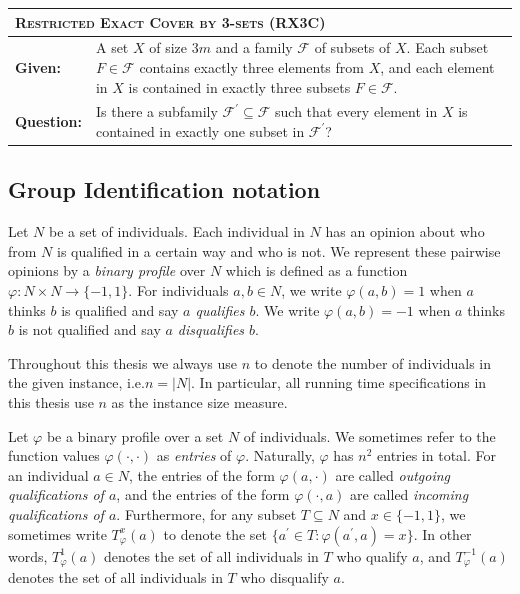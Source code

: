 \documentclass[
    12pt,               %
    a4paper,            %
    bibtotoc,           %
    pointlessnumbers,   %
    ngerman,            %
    titlepage,          %
    leqno,              %
    ]{scrarticle}       %
\begin{document}
\begin{tabularx}{\textwidth}{lX}
\hline
\multicolumn{2}{l}{
\textsc{Restricted Exact Cover by 3-sets} (RX3C)
} \\
\hline
\textbf{Given:} &
A set $X$ of size $3m$ and a family $\mathcal{F}$ of subsets of $X$. \newline
Each subset $F \in \mathcal{F}$ contains exactly three elements from $X$, and each element in $X$ is contained in exactly three subsets $F \in \mathcal{F}$. \\
\textbf{Question:} &
Is there a subfamily $\mathcal{F}^\prime \subseteq \mathcal{F}$ such that every element in $X$ is contained in exactly one subset in $\mathcal{F}^\prime$? \\
\hline
\end{tabularx}

\vspace{\baselineskip}



\subsection{Group Identification notation}

Let $N$ be a set of individuals. Each individual in $N$ has an opinion about who from $N$ is qualified in a certain way and who is not. We represent these pairwise opinions by a \emph{binary profile} over $N$ which is defined as a function $\varphi : N \times N \rightarrow \{ -1, 1 \}$. For individuals $a, b \in N$, we write $\varphi(a, b) = 1$ when $a$ thinks $b$ is qualified and say \emph{$a$ qualifies $b$}. We write $\varphi(a, b) = -1$ when $a$ thinks $b$ is not qualified and say \emph{$a$ disqualifies $b$}.

Throughout this thesis we always use $n$ to denote the number of individuals in the given instance, i.e.\@ $n = |N|$. In particular, all running time specifications in this thesis use $n$ as the instance size measure.

Let $\varphi$ be a binary profile over a set $N$ of individuals. We sometimes refer to the function values $\varphi(\cdot, \cdot)$ as \emph{entries} of $\varphi$. Naturally, $\varphi$ has $n^2$ entries in total. For an individual $a \in N$, the entries of the form $\varphi(a, \cdot)$ are called \emph{outgoing qualifications of $a$}, and the entries of the form $\varphi(\cdot, a)$ are called \emph{incoming qualifications of $a$}. Furthermore, for any subset $T \subseteq N$ and $x \in \{ -1, 1 \}$, we sometimes write $T^x_\varphi(a)$ to denote the set $\{ a^\prime \in T : \varphi(a^\prime, a) = x \}$. In other words, $T^1_\varphi(a)$ denotes the set of all individuals in $T$ who qualify $a$, and $T^{-1}_\varphi(a)$ denotes the set of all individuals in $T$ who disqualify $a$.
\end{document}
